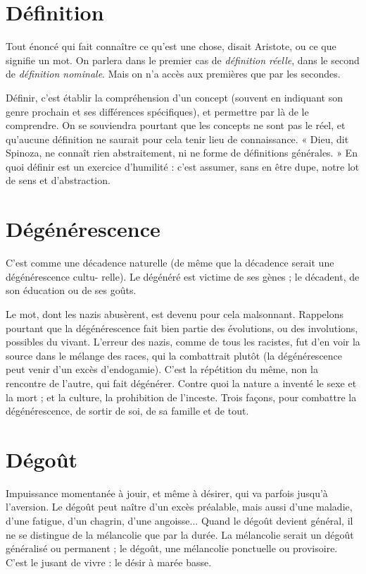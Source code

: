 \section{Définition}
Tout énoncé qui fait connaître ce qu’est une chose, disait
Aristote, ou ce que signifie un mot. On parlera dans le premier
cas de {\it définition réelle}, dans le second de {\it définition nominale}. Mais on n’a
accès aux premières que par les secondes.

Définir, c’est établir la compréhension d’un concept (souvent en indiquant
son genre prochain et ses différences spécifiques), et permettre par là de le comprendre.
On se souviendra pourtant que les concepts ne sont pas le réel, et
qu'aucune définition ne saurait pour cela tenir lieu de connaissance. « Dieu, dit
Spinoza, ne connaît rien abstraitement, ni ne forme de définitions générales. »
En quoi définir est un exercice d’humilité : c’est assumer, sans en être dupe,
notre lot de sens et d’abstraction.

\section{Dégénérescence}
C’est comme une décadence naturelle (de même
que la décadence serait une dégénérescence cultu-
relle). Le dégénéré est victime de ses gènes ; le décadent, de son éducation ou
de ses goûts.

Le mot, dont les nazis abusèrent, est devenu pour cela malsonnant. Rappelons
pourtant que la dégénérescence fait bien partie des évolutions, ou des
involutions, possibles du vivant. L'erreur des nazis, comme de tous les racistes,
fut d’en voir la source dans le mélange des races, qui la combattrait plutôt (la
dégénérescence peut venir d’un excès d’endogamie). C’est la répétition du
même, non la rencontre de l’autre, qui fait dégénérer. Contre quoi la nature a
inventé le sexe et la mort ; et la culture, la prohibition de l’inceste. Trois façons,
pour combattre la dégénérescence, de sortir de soi, de sa famille et de tout.

\section{Dégoût}
Impuissance momentanée à jouir, et même à désirer, qui va
parfois jusqu’à l’aversion. Le dégoût peut naître d’un excès préalable,
mais aussi d’une maladie, d’une fatigue, d’un chagrin, d’une angoisse...
Quand le dégoût devient général, il ne se distingue de la mélancolie que par la
durée. La mélancolie serait un dégoût généralisé ou permanent ; le dégoût, une
mélancolie ponctuelle ou provisoire. C’est le jusant de vivre : le désir à marée
basse.


